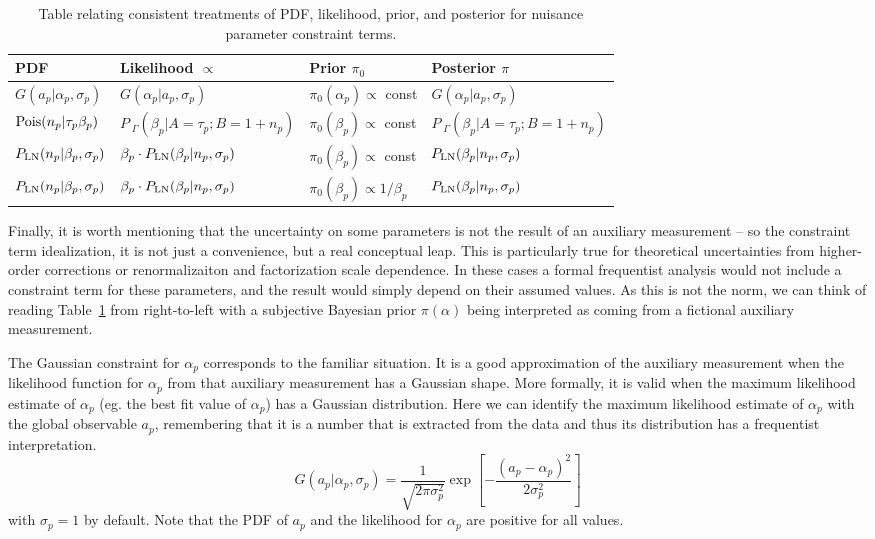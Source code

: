 \documentclass{cernrep}
\newcommand{\Pois}{{\ensuremath{\rm Pois}}}
\newcommand{\LN}{{\ensuremath{P_{\rm LN}}}}
\newcommand{\PGamma}{{\ensuremath{P_{\;\Gamma}}}}
\begin{document}
\begin{table}[*htb]
\center
\begin{tabular}{llll}
PDF & Likelihood $\propto$ & Prior $\pi_0$ & Posterior $\pi$ \\ \hline
$G(a_p | \alpha_p, \sigma_p)$ & $G(\alpha_p | a_p, \sigma_p)$ & $\pi_0(\alpha_p)\propto$  const & $G(\alpha_p | a_p, \sigma_p)$ \\
$\Pois(n_p | \tau_p \beta_p)$ & $\PGamma(\beta_p | A=\tau_p; B=1+n_p)$ & $\pi_0(\beta_p) \propto$  const & $\PGamma(\beta_p | A=\tau_p; B=1+n_p)$ \\
$\LN(n_p | \beta_p, \sigma_p)$ & $ \beta_p  \cdot \LN(\beta_p | n_p, \sigma_p)$ & $\pi_0(\beta_p) \propto $ const & $\LN(\beta_p | n_p, \sigma_p)$ \\
$\LN(n_p | \beta_p, \sigma_p)$ & $\beta_p  \cdot\LN(\beta_p | n_p, \sigma_p)$ & $\pi_0(\beta_p) \propto 1/\beta_p $  & $\LN(\beta_p | n_p, \sigma_p)$\\
\end{tabular}
\caption{Table relating consistent treatments of PDF, likelihood, prior, and posterior for nuisance parameter constraint terms.}
\label{tab:constraints}
\end{table}

Finally, it is worth mentioning that the uncertainty on some parameters is not the result of an auxiliary measurement -- so the constraint term idealization, it is not just a convenience, but a real  conceptual leap.  This is particularly true for theoretical uncertainties from higher-order corrections or renormalizaiton and factorization scale dependence.  In these cases a formal frequentist analysis would not include a constraint term for these parameters, and the result would simply depend on their assumed values.  As this is not the norm, we can think of reading Table~\ref{tab:constraints} from right-to-left with a subjective Bayesian prior $\pi(\alpha)$ being interpreted as coming from a fictional auxiliary measurement.



The Gaussian constraint for $\alpha_p$ corresponds to the familiar situation.  It is a good approximation of the auxiliary measurement when the likelihood function for $\alpha_p$ from that auxiliary measurement has a Gaussian shape.  More formally, it is valid when the maximum likelihood estimate of $\alpha_p$ (eg. the best fit value of $\alpha_p$) has a Gaussian distribution.  Here we can identify the maximum likelihood estimate of $\alpha_p$ with the global observable $a_p$, remembering that it is a number that is extracted from the data and thus its distribution has a frequentist interpretation.  
\begin{equation}
G(a_p | \alpha_p, \sigma_p) = \frac{1}{\sqrt{2\pi \sigma_p^2}} \exp \left[ -\frac{(a_p - \alpha_p)^2}{2\sigma_p^2} \right]
\end{equation}
with $\sigma_p=1$ by default.
Note that the PDF of $a_p$ and the likelihood for $\alpha_p$ are positive for all values. 
\end{document}
